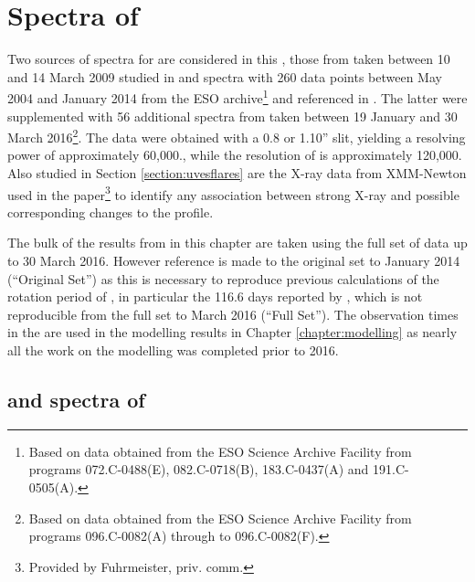 \chapter{Spectra of \prox}
\protect\label{chapter:proxima}

Two sources of spectra for {\prox} are considered in this \paperorthesis, those from {\uves} taken between 10 and 14
March 2009 studied in \citet{fuhrmeister11} and {\harps} spectra with 260 data points between May 2004 and January 2014
from the ESO archive\footnote{Based on data obtained from the ESO Science Archive Facility from programs 072.C-0488(E),
  082.C-0718(B), 183.C-0437(A) and 191.C-0505(A).} and referenced in \citet[Table 3]{suarezmascareno15}. The latter were
supplemented with 56 additional spectra from {\harps} taken between 19 January and 30 March 2016\footnote{Based on data
  obtained from the ESO Science Archive Facility from programs 096.C-0082(A) through to 096.C-0082(F).}. The {\uves}
data were obtained with a 0.8 or 1.10'' slit, yielding a resolving power of approximately 60,000., while the resolution
of {\harps} is approximately 120,000. Also studied in Section \ref{section:uvesflares} are the X-ray data from
XMM-Newton used in the \citet{fuhrmeister11} paper\footnote{Provided by Fuhrmeister, priv. comm.} to identify any
association between strong X-ray  and possible corresponding changes to the {\ha} profile.

The bulk of the results from {\harps} in this chapter are taken using the full set of data up to 30 March 2016. However
reference is made to the original set to January 2014 (``Original Set'') as this is necessary to reproduce previous
calculations of the rotation period of \prox, in particular the 116.6 days reported by \citet[Table
3]{suarezmascareno15}, which is not reproducible from the full set to March 2016 (``Full Set''). The observation times
in the  are used in the modelling results in Chapter \ref{chapter:modelling} as nearly all
the work on the modelling was completed prior to 2016.

\section{{\harps} and {\uves} spectra of \prox}


